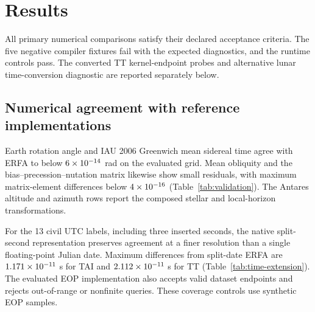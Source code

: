 \section{Results}


All primary numerical comparisons satisfy their declared acceptance criteria. The five negative
compiler fixtures fail with the expected diagnostics, and the runtime controls pass. The converted
TT kernel-endpoint probes and alternative lunar time-conversion diagnostic are reported separately
below.

\subsection{Numerical agreement with reference implementations}

\begin{table}[!tbp]
    \centering
    \caption{Residual distributions against independent references. Time and
        reference-system rows use ERFA; positions use CSPICE with the same DE440s
        kernel and aligned frames. BPN denotes bias--precession--nutation; its residual
        is the maximum absolute matrix-element difference per epoch. Position
        residuals are Euclidean norms; p95 and p99 denote empirical percentiles.
        Unit $1$ denotes a dimensionless quantity.
        $^{*}$Full-JD UTC outputs have a $50\,\mu\mathrm{s}$ acceptance bound;
        zero means no difference resolved at that representation's precision.
        Higher-resolution time results appear in Table~\ref{tab:time-extension}.}
    \label{tab:validation}
    \footnotesize
    
\end{table}

Earth rotation angle and IAU 2006 Greenwich mean sidereal time agree with ERFA to below
$6\times10^{-14}$ rad on the evaluated grid. Mean obliquity and the bias--precession--nutation
matrix likewise show small residuals, with maximum matrix-element differences below $4\times10^{-16}$
(Table~\ref{tab:validation}). The Antares altitude and azimuth rows report the composed stellar and
local-horizon transformations.

For the 13 civil UTC labels, including three inserted seconds, the native split-second
representation preserves agreement at a finer resolution than a single floating-point Julian date.
Maximum differences from split-date ERFA are $1.171\times10^{-11}$ s for TAI and $2.112\times10^{-11}$ s for
TT (Table~\ref{tab:time-extension}). The evaluated EOP implementation also accepts valid dataset
endpoints and rejects out-of-range or nonfinite queries. These coverage controls use synthetic EOP
samples.

